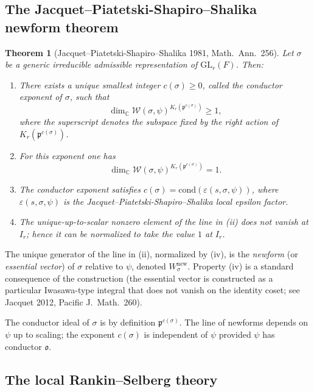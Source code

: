 \documentclass[12pt]{article}
\newtheorem{theorem}{Theorem}
\theoremstyle{definition}
\begin{document}
\subsection{The Jacquet--Piatetski-Shapiro--Shalika newform theorem}

\begin{theorem}[Jacquet--Piatetski-Shapiro--Shalika 1981, Math.\ Ann.\ 256]\label{thm:JPSS-newform}
Let $\sigma$ be a generic irreducible admissible representation of $\mathrm{GL}_r(F)$. Then:
\begin{enumerate}
\item[\textup{(i)}] There exists a unique smallest integer $c(\sigma)\ge 0$, called the \emph{conductor exponent} of $\sigma$, such that
$$\dim_\mathbb{C}\mathcal{W}(\sigma,\psi)^{K_r(\mathfrak{p}^{c(\sigma)})}\ge 1,$$
where the superscript denotes the subspace fixed by the right action of $K_r(\mathfrak{p}^{c(\sigma)})$.
\item[\textup{(ii)}] For this exponent one has
$$\dim_\mathbb{C}\mathcal{W}(\sigma,\psi)^{K_r(\mathfrak{p}^{c(\sigma)})}=1.$$
\item[\textup{(iii)}] The conductor exponent satisfies $c(\sigma)=\mathrm{cond}(\varepsilon(s,\sigma,\psi))$, where $\varepsilon(s,\sigma,\psi)$ is the Jacquet--Piatetski-Shapiro--Shalika local epsilon factor.
\item[\textup{(iv)}] The unique-up-to-scalar nonzero element of the line in (ii) does not vanish at $I_r$; hence it can be normalized to take the value $1$ at $I_r$.
\end{enumerate}
\end{theorem}

\noindent The unique generator of the line in (ii), normalized by (iv), is the \emph{newform} (or \emph{essential vector}) of $\sigma$ relative to $\psi$, denoted $W_\sigma^{\mathrm{new}}$. Property (iv) is a standard consequence of the construction (the essential vector is constructed as a particular Iwasawa-type integral that does not vanish on the identity coset; see Jacquet 2012, Pacific J.\ Math.\ 260).

The conductor ideal of $\sigma$ is by definition $\mathfrak{p}^{c(\sigma)}$. The line of newforms depends on $\psi$ up to scaling; the exponent $c(\sigma)$ is independent of $\psi$ provided $\psi$ has conductor $\mathfrak{o}$.

\subsection{The local Rankin--Selberg theory}
\end{document}
